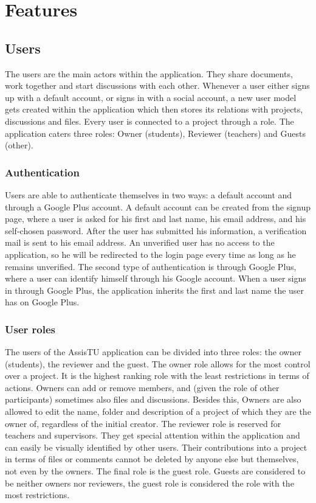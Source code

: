 \chapter{Features}
\section{Users}

The users are the main actors within the application. They share documents, work together and start discussions with each other. Whenever
a user either signs up with a default account, or signs in with a social account, a new user model gets created within the application which then
stores its relations with projects, discussions and files. Every user is connected to a project through a role. The application caters three roles: 
Owner (students), Reviewer (teachers) and Guests (other).

\subsection{Authentication}

Users are able to authenticate themselves in two ways: a default account and through a Google Plus account. A default account can be created from the 
signup page, where a user is asked for his first and last name, his email address, and his self-chosen password. After the user has submitted his 
information, a verification mail is sent to his email address. An unverified user has no access to the application, so he will be redirected to the 
login page every time as long as he remains unverified. The second type of authentication is through
Google Plus, where a user can identify himself through his Google account. When a user signs in through Google Plus, the application inherits
the first and last name the user has on Google Plus.

\subsection{User roles}

The users of the AssisTU application can be divided into three roles: the owner (students), the reviewer and the guest. The owner role allows for the 
most control over a project. It is the highest ranking role with the least restrictions in terms of actions.
Owners can add or remove members, and (given the role of other participants) sometimes also files and discussions. Besides this, Owners are also 
allowed to edit the name, folder and description of a project of which they are the owner of, regardless of the initial creator. 
The reviewer role is reserved for teachers and supervisors. They get special attention within the application and can easily be visually identified by 
other users. Their contributions into a project in terms of files or comments cannot be deleted by anyone else but themselves, not even by the owners. 
The final role is the guest role. Guests are considered to be neither owners nor reviewers, the guest role is considered the role with the most 
restrictions.

